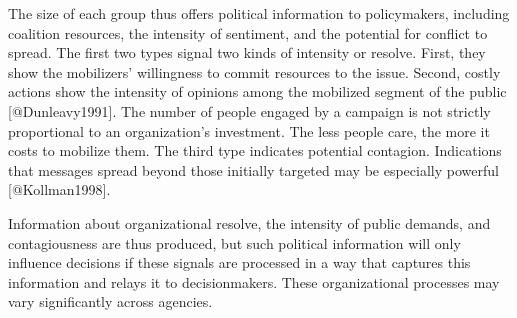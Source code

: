 The size of each group thus offers political information to policymakers, including coalition resources, the intensity of sentiment, and the potential for conflict to spread. The first two types signal two kinds of intensity or resolve. First, they show the mobilizers' willingness to commit resources to the issue. Second, costly actions show the intensity of opinions among the mobilized segment of the public [@Dunleavy1991]. The number of people engaged by a campaign is not strictly proportional to an organization's investment. The less people care, the more it costs to mobilize them. The third type indicates potential contagion. Indications that messages spread beyond those initially targeted may be especially powerful [@Kollman1998]. 

Information about organizational resolve, the intensity of public demands, and contagiousness are thus produced, but %
such political information will only influence decisions if these signals are processed in a way that captures this information and relays it to decisionmakers. These organizational processes may vary significantly across agencies.

